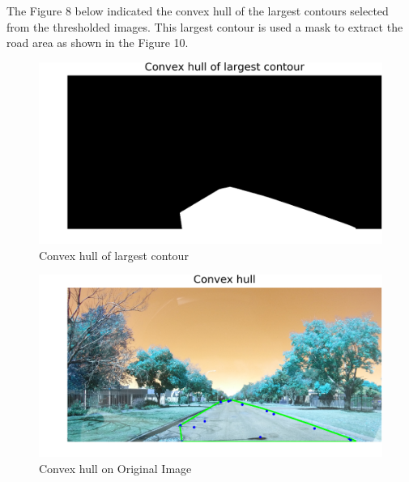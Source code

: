 \documentclass[journal]{IEEEtran}
\begin{document}
\noindent The Figure 8 below indicated the convex hull of the largest contours selected from the thresholded images. This largest contour is used a mask to extract the road area as shown in the Figure 10.


\begin{figure}[!htb]
\begin{center}
\includegraphics[scale=0.65]{Images/5_Convex_hull_of_largest_contour.png}
\end{center}
\caption{Convex hull of largest contour}
\end{figure}



\begin{figure}[!htb]
\begin{center}
\includegraphics[scale=1]{Images/6_Convex_hull.png}
\end{center}
\caption{Convex hull on Original Image}
\end{figure}
\newpage
\end{document}
